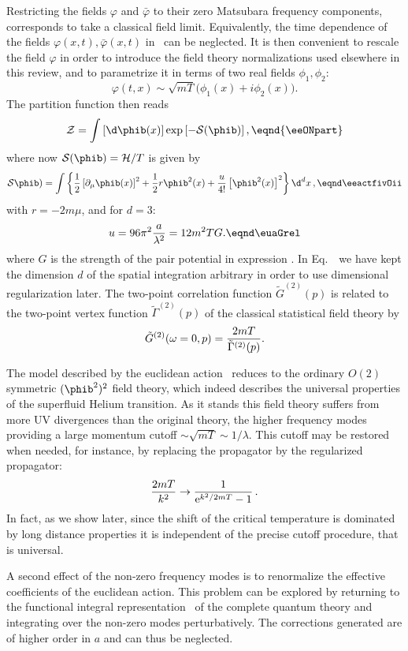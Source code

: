 Restricting  the fields $ \varphi$ and $\bar \varphi $ to their zero Matsubara frequency components, corresponds to take a classical field limit.
Equivalently,  the time dependence of the fields  $\varphi(x,t),\bar\varphi(x,t)$
in \eactBEdel\ can be neglected.
It is then
convenient to rescale the field $ \varphi$ in order to introduce  the
field theory normalizations used elsewhere in this review, and to parametrize it in terms of two real fields
$\phi_1,\phi_2$:
$$\varphi(t,x)\sim \sqrt{mT}\bigl(\phi_1(x)+i\phi_2(x)\bigr).$$
  The partition function
then reads
$$
 {\cal Z}= \int \left[ \d \phib (x) \right] \exp \left[-{\cal S}(\phib)\right]
 , \eqnd{\eeONpart}
$$
where now ${\cal S}(\phib)={\cal H}/T$ is given by
$$
{\cal S}   \phib  )= \int \left\lbrace{ 1 \over 2} \left[
\partial_{\mu} \phib (x) \right]^2+{1 \over 2}r
\phib^2 (x)+{u \over 4!}  \left[ \phib^2(x) \right]^2 \right\rbrace \d^{d}x\,,
\eqnd\eeactfivOii
$$
with $r=-2m \mu$, and for $d=3$:
$$
u=96 \pi^2\lfrac{a}{\lambda^2} = 12 m^2 T G.\eqnd\euaGrel
$$
where $G$ is the strength of the pair potential in expression \eactBEdel.  In Eq.~\eeactfivOii\ we have kept the dimension
$d$ of the spatial integration arbitrary in order to use dimensional regularization later. The two-point correlation
function $\tilde G^{(2)}(p)$ is related to the two-point vertex
function $\tilde\Gamma^{(2)}(p)$ of the classical statistical
field theory by
$$
\tilde G^{(2)}( \omega =0,p)={\displaystyle{2mT\over \tilde\Gamma^{(2)}(p)}}.
$$

The model described by the euclidean action \eeactfivOii\ reduces to the
ordinary $O(2)$ symmetric $(\phib^2)^2$ field theory, which indeed describes the universal properties of the superfluid Helium transition.  As it stands this
field theory suffers from more UV divergences than the
original theory, the higher frequency modes providing a large momentum
cutoff $\sim \sqrt{m T}\sim 1/\lambda$.  This cutoff may be restored when
needed, for instance, by replacing the propagator by the regularized propagator:
$$
{2mT \over  k^2}\rightarrow {1\over {\rm e}^{k^2/2mT}-1}\,.
$$
In fact, as we show later, since the shift of the critical temperature is
dominated by long distance properties it is independent of the precise
cutoff procedure, that is universal.

    A second effect of the non-zero frequency modes is to renormalize the effective coefficients of the euclidean action.  This problem can be explored
by returning to the functional integral representation \eactBEdel\ of the complete quantum
theory and integrating over the non-zero modes perturbatively.  The
corrections generated are of higher order in $a$ and can thus be neglected.


